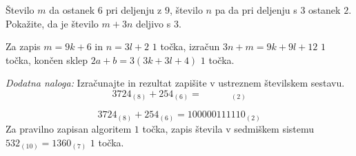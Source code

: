 \documentclass[addpoints]{exam}
\begin{document}
\begin{questions}
    


    \question[3]
    Število $m$ da ostanek $6$ pri deljenju z $9$, število $n$ pa da pri deljenju s $3$ ostanek $2$.
    Pokažite, da je število $m+3n$ deljivo s $3$.
    
    \begin{solution}[3cm]
        Za zapis $m=9k+6$ in $n=3l+2$ $1$ točka, izračun $3n+m=9k+9l+12$ $1$ točka, končen sklep $2a+b=3(3k+3l+4)$ $1$ točka.
    \end{solution}

        




     \newpage

    \bonusquestion[3]
    \textit{Dodatna naloga:} Izračunajte in rezultat zapišite v ustreznem številskem sestavu.
                $$ 3724_{(8)}+ 254_{(6)}= \quad \quad \quad _{(2)} $$

    \begin{solution}[7cm]
        $$ 3724_{(8)}+ 254_{(6)}= 100000111110_{(2)} $$
        Za pravilno zapisan algoritem $1$ točka, zapis števila v sedmiškem sistemu $532_{(10)}=1360_{(7)}$ $1$ točka.
    \end{solution}




\end{questions}
\end{document}
